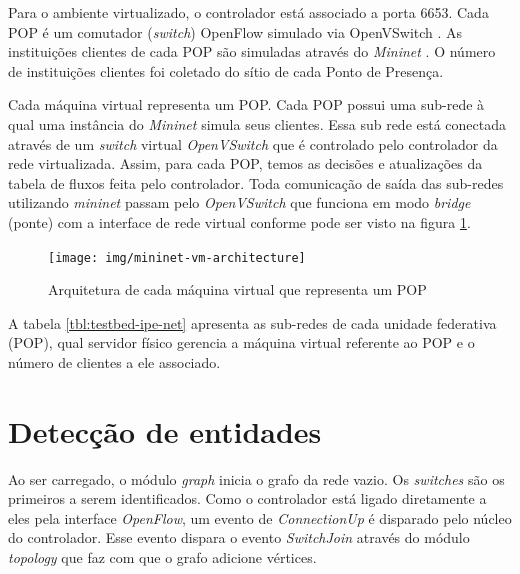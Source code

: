 Para o ambiente virtualizado, o controlador está associado a porta 6653.
Cada POP é um comutador (\emph{switch}) OpenFlow simulado via OpenVSwitch
\citep{openvswitch2015switch}.
As instituições clientes de cada POP são simuladas através do \emph{Mininet}
\citep{lantz2010network}.
O número de instituições clientes foi coletado do sítio de cada Ponto de
Presença.

Cada máquina virtual representa um POP.
Cada POP possui uma sub-rede à qual uma instância do \emph{Mininet} simula
seus clientes.
Essa sub rede está conectada através de um \emph{switch} virtual
\emph{OpenVSwitch} que é controlado pelo controlador da rede virtualizada.
Assim, para cada POP, temos as decisões e atualizações da tabela de fluxos
feita pelo controlador.
Toda comunicação de saída das sub-redes utilizando \emph{mininet} passam pelo
\emph{OpenVSwitch} que funciona em modo \emph{bridge} (ponte) com a interface
de rede virtual conforme pode ser visto na figura
\ref{fig:mininet-vm-architecture}.


\begin{figure}[h!]
    \centering
    \label{fig:mininet-vm-architecture}
    \texttt{[image: img/mininet-vm-architecture]}
    \caption{Arquitetura de cada máquina virtual que representa um POP}
\end{figure}


A tabela \ref{tbl:testbed-ipe-net} apresenta as sub-redes de cada unidade
federativa (POP), qual servidor físico gerencia a máquina virtual referente
ao POP e o número de clientes a ele associado.




\section{Detecção de entidades}

Ao ser carregado, o módulo \emph{graph} inicia o grafo da rede vazio.
Os \emph{switches} são os primeiros a serem identificados.
Como o controlador está ligado diretamente a eles pela interface
\emph{OpenFlow}, um evento de \emph{ConnectionUp} é disparado
pelo núcleo do controlador.
Esse evento dispara o evento \emph{SwitchJoin} através do módulo
\emph{topology} que faz com que o grafo adicione vértices.


